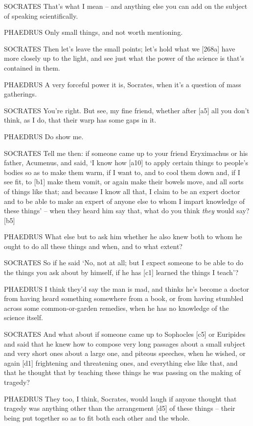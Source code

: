 SOCRATES That's what I mean -- and anything else you can add on the
subject of speaking scientifically.

PHAEDRUS Only small things, and not worth mentioning.

SOCRATES Then let's leave the small points; let's hold what we
{[}268a{]} have more closely up to the light, and see just what the
power of the science is that's contained in them.

PHAEDRUS A very forceful power it is, Socrates, when it's a question of
mass gatherings.

SOCRATES You're right. But see, my fine friend, whether after {[}a5{]}
all you don't think, as I do, that their warp has some gaps in it.

PHAEDRUS Do show me.

SOCRATES Tell me then: if someone came up to your friend Eryximachus or
his father, Acumenus,
and said, ‘I know how {[}a10{]} to apply certain things to people's
bodies so as to make them warm, if I want to, and to cool them down and,
if I see fit, to {[}b1{]} make them vomit, or again make their bowels
move, and all sorts of things like that; and because I know all that, I
claim to be an expert doctor and to be able to make an expert of anyone
else to whom I impart knowledge of these things' -- when they heard him
say that, what do you think {\em they} would say? {[}b5{]}

PHAEDRUS What else but to ask him whether he also knew both to whom he
ought to do all these things and when, and to what extent?

SOCRATES So if he said ‘No, not at all; but I expect someone to be able
to do the things you ask about by himself, if he has {[}c1{]} learned
the things I teach'?

PHAEDRUS I think they'd say the man is mad, and thinks he's become a
doctor from having heard something somewhere from a book, or from having
stumbled across some common-or-garden remedies, when he has no knowledge
of the science itself.

SOCRATES And what about if someone came up to Sophocles {[}c5{]} or
Euripides and said that he knew how to compose very long passages about
a small subject and very short ones about a large one, and piteous
speeches, when he wished, or again {[}d1{]} frightening and threatening
ones, and everything else like that, and that he thought that by
teaching these things he was passing on the making of tragedy?

PHAEDRUS They too, I think, Socrates, would laugh if anyone thought that
tragedy was anything other than the arrangement {[}d5{]} of these things
-- their being put together so as to fit both each other and the whole.

